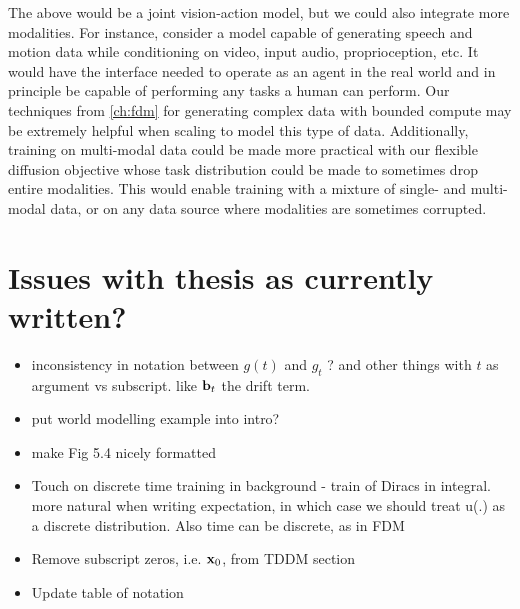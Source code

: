 The above would be a joint vision-action model, but we could also integrate more modalities. For instance, consider a model capable of generating speech and motion data while conditioning on video, input audio, proprioception, etc. It would have the interface needed to operate as an agent in the real world and in principle be capable of performing any tasks a human can perform. Our techniques from \cref{ch:fdm} for generating complex data with bounded compute may be extremely helpful when scaling to model this type of data. Additionally, training on multi-modal data could be made more practical with our flexible diffusion objective whose task distribution could be made to sometimes drop entire modalities. This would enable training with a mixture of single- and multi-modal data, or on any data source where modalities are sometimes corrupted.


\section*{Issues with thesis as currently written?}

\begin{itemize}
    \item inconsistency in notation between $g(t)$ and $g_t$ ? and other things with $t$ as argument vs subscript. like ${\mathbf{b}}_t$ the drift term.
    \item put world modelling example into intro?
    \item make Fig 5.4 nicely formatted
    \item Touch on discrete time training in background - train of Diracs in integral. more natural when writing expectation, in which case we should treat u(.) as a discrete distribution. Also time can be discrete, as in FDM
    \item Remove subscript zeros, i.e. ${\mathbf{x}}_0$, from TDDM section
    \item Update table of notation
\end{itemize}

